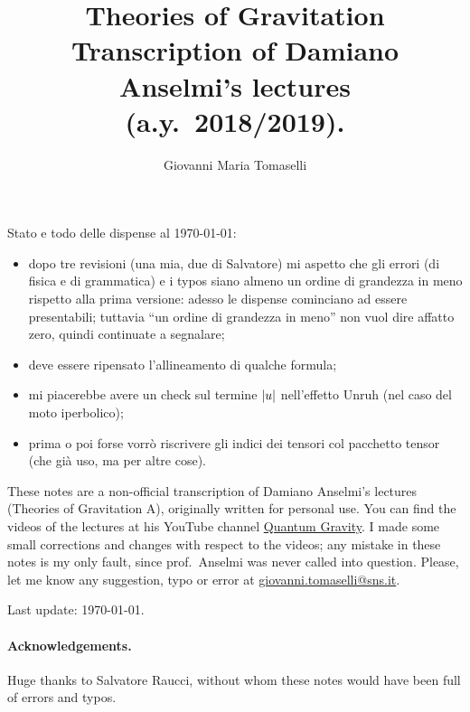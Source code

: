 \documentclass[a4paper,12pt]{book}
\DeclarePairedDelimiter{\abs}{\lvert}{\rvert}
\theoremstyle{definition}
\theoremstyle{remark}
\begin{document}
\author{Giovanni Maria Tomaselli}
\title{Theories of Gravitation\\ \vspace{0.5em} \footnotesize{Transcription of Damiano Anselmi's lectures (a.y.~2018/2019).}}
\date{}
\maketitle

Stato e todo delle dispense al \today:
\begin{itemize}
\item dopo tre revisioni (una mia, due di Salvatore) mi aspetto che gli errori (di fisica e di grammatica) e i typos siano almeno un ordine di grandezza in meno rispetto alla prima versione: adesso le dispense cominciano ad essere presentabili; tuttavia ``un ordine di grandezza in meno'' non vuol dire affatto zero, quindi continuate a segnalare;
\item deve essere ripensato l'allineamento di qualche formula;
\item mi piacerebbe avere un check sul termine $\abs{u}$ nell'effetto Unruh (nel caso del moto iperbolico);
\item prima o poi forse vorrò riscrivere gli indici dei tensori col pacchetto tensor (che già uso, ma per altre cose).
\end{itemize}
\vfill
These notes are a non-official transcription of Damiano Anselmi's lectures (Theories of Gravitation A), originally written for personal use. You can find the videos of the lectures at his YouTube channel \href{https://www.youtube.com/watch?v=VRAMDa6kpqw&list=PLlx_2qxtgAiO_FCa3WvC-39J6c_EpE2wK}{Quantum Gravity}. I made some small corrections and changes with respect to the videos; any mistake in these notes is my only fault, since prof.~Anselmi was never called into question. Please, let me know any suggestion, typo or error at \href{mailto:giovanni.tomaselli@sns.it}{giovanni.tomaselli@sns.it}.

\vspace{1cm}
Last update: \today.
\vspace{1cm}

\paragraph{Acknowledgements.} Huge thanks to Salvatore Raucci, without whom these notes would have been full of errors and typos.

\tableofcontents
\end{document}

